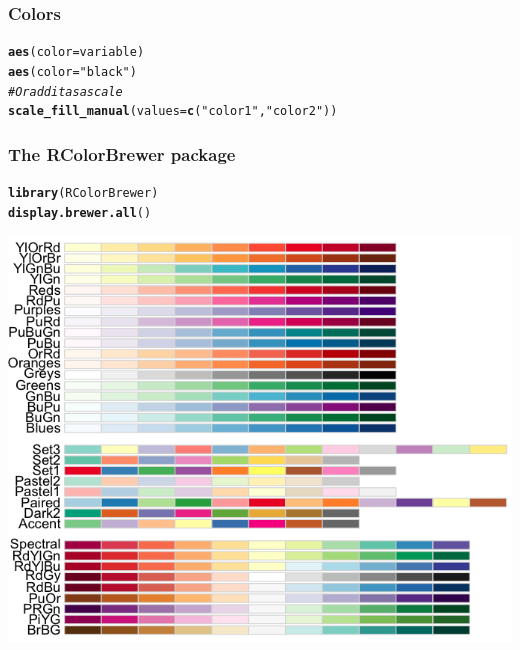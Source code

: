 \documentclass{beamer}\usepackage[]{graphicx}\usepackage[]{color}
\makeatletter
\newcommand{\hlstr}[1]{\textcolor[rgb]{0.192,0.494,0.8}{#1}}%
\newcommand{\hlcom}[1]{\textcolor[rgb]{0.678,0.584,0.686}{\textit{#1}}}%
\newcommand{\hlkwd}[1]{\textcolor[rgb]{0.737,0.353,0.396}{\textbf{#1}}}%
\newenvironment{kframe}{%
 \def\at@end@of@kframe{}%
 \ifinner\ifhmode%
  \def\at@end@of@kframe{\end{minipage}}%
  \begin{minipage}{\columnwidth}%
 \fi\fi%
 \def\FrameCommand##1{\hskip\@totalleftmargin \hskip-\fboxsep
 \colorbox{shadecolor}{##1}\hskip-\fboxsep
     \hskip-\linewidth \hskip-\@totalleftmargin \hskip\columnwidth}%
 \MakeFramed {\advance\hsize-\width
   \@totalleftmargin\z@ \linewidth\hsize
   \@setminipage}}%
 {\par\unskip\endMakeFramed%
 \at@end@of@kframe}
\newenvironment{knitrout}{}{} %
\makeatother
\begin{document}
\begin{frame}[fragile]
\frametitle{Colors}
\begin{knitrout}\footnotesize
{}\color{fgcolor}\begin{kframe}
\begin{alltt}
\hlkwd{aes}(color = variable)
\hlkwd{aes}(color = \hlstr{"black"})
\hlcom{# Or add it as a scale}
\hlkwd{scale_fill_manual}(values = \hlkwd{c}(\hlstr{"color1"}, \hlstr{"color2"}))
\end{alltt}
\end{kframe}
\end{knitrout}

\end{frame}


\begin{frame}[fragile]
\frametitle{The RColorBrewer package}
\begin{knitrout}\footnotesize
{}\color{fgcolor}\begin{kframe}
\begin{alltt}
\hlkwd{library}(RColorBrewer)
\hlkwd{display.brewer.all}()
\end{alltt}
\end{kframe}
\end{knitrout}

\begin{center}
\includegraphics[scale=0.25]{images/color_palette.png}
\end{center}
\end{frame}
\end{document}
